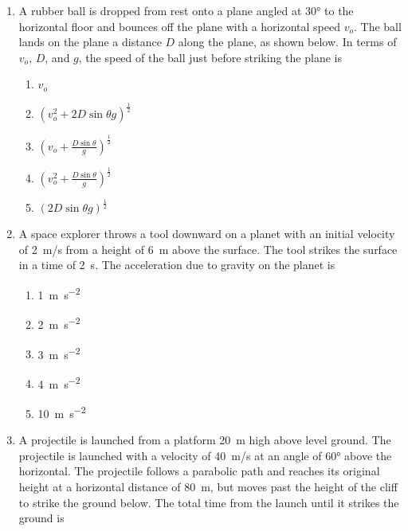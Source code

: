 \documentclass{../../oss-apphys}
\begin{document}
\begin{multicols}{2}
\begin{enumerate}[leftmargin=18pt]
  \item A rubber ball is dropped from rest onto a plane angled at \ang{30} to
    the horizontal floor and bounces off the plane with a horizontal speed
    $v_o$. The ball lands on the plane a distance $D$ along the plane, as shown
    below. In terms of $v_o$, $D$, and $g$, the speed of the ball just before
    striking the plane is
    \begin{center}
    \end{center}
    \begin{enumerate}[noitemsep,topsep=0pt,leftmargin=18pt,label=(\Alph*)]
    \item $v_o$
    \item $\displaystyle\left(v_o^2+2D\sin\theta g\right)^\frac{1}{2}$
    \item $\displaystyle\left(v_o+\frac{D\sin\theta}{g}\right)^\frac{1}{2}$
    \item $\displaystyle\left(v_o^2+\frac{D\sin\theta}{g}\right)^\frac{1}{2}$
    \item $\displaystyle\left(2D\sin\theta g\right)^\frac{1}{2}$
    \end{enumerate}
    \columnbreak
    
  \item A space explorer throws a tool downward on a planet with an initial
    velocity of \SI{2}{m/s} from a height of \SI{6}{m} above the surface. The
    tool strikes the surface in a time of \SI{2}{\second}. The acceleration due
    to gravity on the planet is
    \begin{enumerate}[noitemsep,topsep=0pt,leftmargin=18pt,label=(\Alph*)]
    \item\SI{1 }{\metre\per\second^2}
    \item\SI{2 }{\metre\per\second^2}
    \item\SI{3 }{\metre\per\second^2}
    \item\SI{4 }{\metre\per\second^2}
    \item\SI{10}{\metre\per\second^2}
    \end{enumerate}
    
  \item A projectile is launched from a platform \SI{20}{m} high above level
    ground. The projectile is launched with a velocity of \SI{40}{m/s} at an
    angle of \ang{60} above the horizontal. The projectile follows a parabolic
    path and reaches its original height at a horizontal distance of \SI{80}{m},
    but moves past the height of the cliff to strike the ground below. The total
    time from the launch until it strikes the ground is


\end{enumerate}
\end{multicols}
\end{document}
